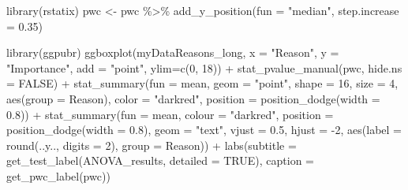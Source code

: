 \documentclass[
]{article}
\newenvironment{Shaded}{\begin{snugshade}}{\end{snugshade}}
\newcommand{\AttributeTok}[1]{\textcolor[rgb]{0.77,0.63,0.00}{#1}}
\newcommand{\ConstantTok}[1]{\textcolor[rgb]{0.00,0.00,0.00}{#1}}
\newcommand{\DecValTok}[1]{\textcolor[rgb]{0.00,0.00,0.81}{#1}}
\newcommand{\FloatTok}[1]{\textcolor[rgb]{0.00,0.00,0.81}{#1}}
\newcommand{\FunctionTok}[1]{\textcolor[rgb]{0.00,0.00,0.00}{#1}}
\newcommand{\NormalTok}[1]{#1}
\newcommand{\OtherTok}[1]{\textcolor[rgb]{0.56,0.35,0.01}{#1}}
\newcommand{\SpecialCharTok}[1]{\textcolor[rgb]{0.00,0.00,0.00}{#1}}
\newcommand{\StringTok}[1]{\textcolor[rgb]{0.31,0.60,0.02}{#1}}
\begin{document}
\begin{Shaded}
\begin{Highlighting}[]
\FunctionTok{library}\NormalTok{(rstatix)}
\NormalTok{pwc }\OtherTok{\textless{}{-}}\NormalTok{ pwc }\SpecialCharTok{\%\textgreater{}\%} 
       \FunctionTok{add\_y\_position}\NormalTok{(}\AttributeTok{fun =} \StringTok{"median"}\NormalTok{, }\AttributeTok{step.increase =} \FloatTok{0.35}\NormalTok{)}

\FunctionTok{library}\NormalTok{(ggpubr)}
\FunctionTok{ggboxplot}\NormalTok{(myDataReasons\_long, }\AttributeTok{x =} \StringTok{"Reason"}\NormalTok{, }\AttributeTok{y =} \StringTok{"Importance"}\NormalTok{, }\AttributeTok{add =} \StringTok{"point"}\NormalTok{, }\AttributeTok{ylim=}\FunctionTok{c}\NormalTok{(}\DecValTok{0}\NormalTok{, }\DecValTok{18}\NormalTok{)) }\SpecialCharTok{+}
  \FunctionTok{stat\_pvalue\_manual}\NormalTok{(pwc, }\AttributeTok{hide.ns =} \ConstantTok{FALSE}\NormalTok{) }\SpecialCharTok{+}
  \FunctionTok{stat\_summary}\NormalTok{(}\AttributeTok{fun =}\NormalTok{ mean, }\AttributeTok{geom =} \StringTok{"point"}\NormalTok{, }\AttributeTok{shape =} \DecValTok{16}\NormalTok{, }\AttributeTok{size =} \DecValTok{4}\NormalTok{,}
               \FunctionTok{aes}\NormalTok{(}\AttributeTok{group =}\NormalTok{ Reason), }\AttributeTok{color =} \StringTok{"darkred"}\NormalTok{,}
               \AttributeTok{position =} \FunctionTok{position\_dodge}\NormalTok{(}\AttributeTok{width =} \FloatTok{0.8}\NormalTok{)) }\SpecialCharTok{+}
  \FunctionTok{stat\_summary}\NormalTok{(}\AttributeTok{fun =}\NormalTok{ mean, }\AttributeTok{colour =} \StringTok{"darkred"}\NormalTok{, }
               \AttributeTok{position =} \FunctionTok{position\_dodge}\NormalTok{(}\AttributeTok{width =} \FloatTok{0.8}\NormalTok{),}
               \AttributeTok{geom =} \StringTok{"text"}\NormalTok{, }\AttributeTok{vjust =} \FloatTok{0.5}\NormalTok{, }\AttributeTok{hjust =} \SpecialCharTok{{-}}\DecValTok{2}\NormalTok{,}
               \FunctionTok{aes}\NormalTok{(}\AttributeTok{label =} \FunctionTok{round}\NormalTok{(..y.., }\AttributeTok{digits =} \DecValTok{2}\NormalTok{), }\AttributeTok{group =}\NormalTok{ Reason)) }\SpecialCharTok{+}
  \FunctionTok{labs}\NormalTok{(}\AttributeTok{subtitle =} \FunctionTok{get\_test\_label}\NormalTok{(ANOVA\_results,  }\AttributeTok{detailed =} \ConstantTok{TRUE}\NormalTok{),}
       \AttributeTok{caption =} \FunctionTok{get\_pwc\_label}\NormalTok{(pwc))}
\end{Highlighting}
\end{Shaded}
\end{document}
